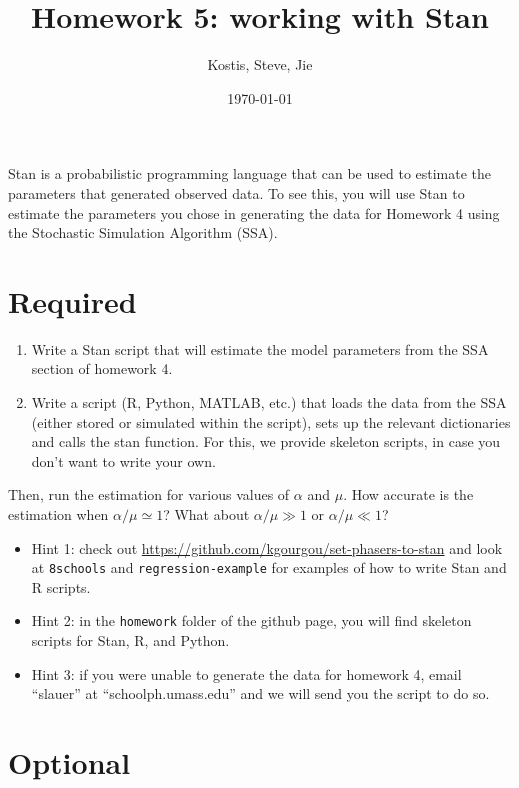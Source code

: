 \documentclass{article}\usepackage[]{graphicx}\usepackage[]{color}
\title{Homework 5: working with Stan}
\author{Kostis, Steve, Jie}
\date{\today}
\begin{document}
\maketitle

Stan is a probabilistic programming language that can be used to estimate the parameters that generated observed data. To see this, you will use Stan to estimate the parameters you chose in generating the data for Homework 4 using the Stochastic Simulation Algorithm (SSA).

\section{Required}

\begin{enumerate}
    \item Write a Stan script that will estimate the model parameters from the SSA section of homework 4.
    \item Write a script (R, Python, MATLAB, etc.) that loads the data from the
      SSA (either stored or simulated within the script), sets up the relevant
      dictionaries and calls the stan function. For this, we provide skeleton
      scripts, in case you don't want to write your own. 
\end{enumerate}

Then, run the estimation for various values of $\alpha$ and $\mu$. How accurate
is the estimation when $\alpha/\mu\simeq 1$?  What about $\alpha/\mu\gg 1$ or
$\alpha/\mu\ll 1$?

\begin{itemize}
\item Hint 1: check out \url{https://github.com/kgourgou/set-phasers-to-stan} and look at {\tt 8schools} and {\tt regression-example} for examples of how to write Stan and R scripts.

\item Hint 2: in the {\tt homework} folder of the github page, you will find skeleton scripts for Stan, R, and Python.

\item Hint 3: if you were unable to generate the data for homework 4, email ``slauer'' at ``schoolph.umass.edu'' and we will send you the script to do so.
\end{itemize}

\section{Optional}
\end{document}
